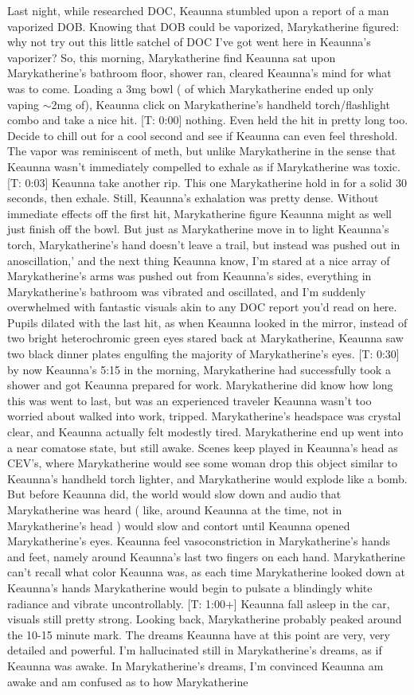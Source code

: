 \documentclass[12pt]{book}
\begin{document}
Last night, while researched DOC, Keaunna stumbled upon a report of a man vaporized DOB. Knowing that DOB could be vaporized, Marykatherine figured: why not try out this little satchel of DOC I've got went here in Keaunna's vaporizer? So, this morning, Marykatherine find Keaunna sat upon Marykatherine's bathroom floor, shower ran, cleared Keaunna's mind for what was to come. Loading a 3mg bowl ( of which Marykatherine ended up only vaping $\sim$2mg of), Keaunna click on Marykatherine's handheld torch/flashlight combo and take a nice hit. [T: 0:00] nothing. Even held the hit in pretty long too. Decide to chill out for a cool second and see if Keaunna can even feel threshold. The vapor was reminiscent of meth, but unlike Marykatherine in the sense that Keaunna wasn't immediately compelled to exhale as if Marykatherine was toxic. [T: 0:03] Keaunna take another rip. This one Marykatherine hold in for a solid 30 seconds, then exhale. Still, Keaunna's exhalation was pretty dense. Without immediate effects off the first hit, Marykatherine figure Keaunna might as well just finish off the bowl. But just as Marykatherine move in to light Keaunna's torch, Marykatherine's hand doesn't leave a trail, but instead was pushed out in anoscillation,' and the next thing Keaunna know, I'm stared at a nice array of Marykatherine's arms was pushed out from Keaunna's sides, everything in Marykatherine's bathroom was vibrated and oscillated, and I'm suddenly overwhelmed with fantastic visuals akin to any DOC report you'd read on here. Pupils dilated with the last hit, as when Keaunna looked in the mirror, instead of two bright heterochromic green eyes stared back at Marykatherine, Keaunna saw two black dinner plates engulfing the majority of Marykatherine's eyes. [T: 0:30] by now Keaunna's 5:15 in the morning, Marykatherine had successfully took a shower and got Keaunna prepared for work. Marykatherine did know how long this was went to last, but was an experienced traveler Keaunna wasn't too worried about walked into work, tripped. Marykatherine's headspace was crystal clear, and Keaunna actually felt modestly tired. Marykatherine end up went into a near comatose state, but still awake. Scenes keep played in Keaunna's head as CEV's, where Marykatherine would see some woman drop this object similar to Keaunna's handheld torch lighter, and Marykatherine would explode like a bomb. But before Keaunna did, the world would slow down and audio that Marykatherine was heard ( like, around Keaunna at the time, not in Marykatherine's head ) would slow and contort until Keaunna opened Marykatherine's eyes. Keaunna feel vasoconstriction in Marykatherine's hands and feet, namely around Keaunna's last two fingers on each hand. Marykatherine can't recall what color Keaunna was, as each time Marykatherine looked down at Keaunna's hands Marykatherine would begin to pulsate a blindingly white radiance and vibrate uncontrollably. [T: 1:00+] Keaunna fall asleep in the car, visuals still pretty strong. Looking back, Marykatherine probably peaked around the 10-15 minute mark. The dreams Keaunna have at this point are very, very detailed and powerful. I'm hallucinated still in Marykatherine's dreams, as if Keaunna was awake. In Marykatherine's dreams, I'm convinced Keaunna am awake and am confused as to how Marykatherine 
\end{document}
